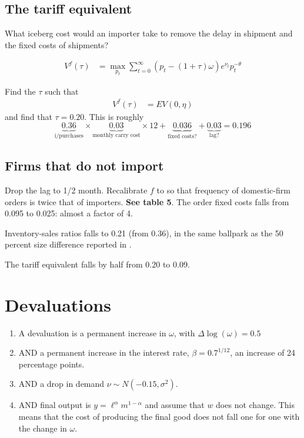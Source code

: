 \documentclass[11pt, pdftex]{article}
\begin{document}
\subsection{The tariff equivalent}
What iceberg cost would an importer take to remove the delay in shipment and the fixed costs of shipments?

\begin{align}\label{}
  V^f(\tau) & =\max_{p_t}\sum_{t=0}^{\infty}\left( p_t-(1+\tau)\omega  \right)e^{\nu_t}p_t^{-\theta}
\end{align}

Find the $\tau$ such that
\begin{align}\label{}
  V^f(\tau) & = EV(0,\eta)
\end{align}
and find that $\tau=0.20$. This is roughly
\begin{equation}\label{}
  \underbrace{0.36}_{\text{i/purchases}}\times \underbrace{0.03}_{\text{monthly carry cost}} \times 12 + \underbrace{0.036}_{\text{fixed costs?}}+\underbrace{0.03}_{\text{lag?}} = 0.196
\end{equation}

\subsection{Firms that do not import}

Drop the lag to 1/2 month. Recalibrate $f$ to so that frequency of domestic-firm orders is twice that of importers. \textbf{See table 5}. The order fixed costs falls from 0.095 to 0.025: almost a factor of 4.

Inventory-sales ratios falls to 0.21 (from 0.36), in the same ballpark as the 50 percent size difference reported in \citet{hall2003steel}.

The tariff equivalent falls by half from 0.20 to 0.09.

\section{Devaluations}
\begin{enumerate}
\item A devaluation is a permanent increase in $\omega$, with $\Delta \log(\omega)=0.5$

\item AND a permanent increase in the interest rate, $\beta=0.7^{1/12}$, an increase of 24 percentage points.

\item AND a drop in demand $\nu \sim N(-0.15, \sigma^2)$.

\item AND final output is $y=\ell^{\alpha}m^{1-\alpha}$ and assume that $w$ does not change. This means that the cost of producing the final good does not fall one for one with the change in $\omega$.
\end{enumerate}
\end{document}
